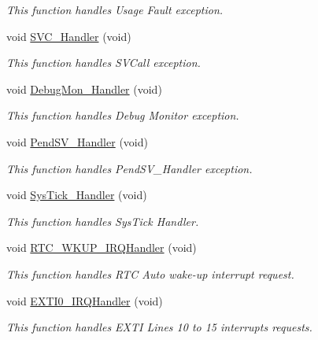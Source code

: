 \begin{DoxyCompactItemize}
\begin{DoxyCompactList}\small\item\em This function handles Usage Fault exception. \end{DoxyCompactList}\item 
void \hyperlink{group___p_w_r___current_consumption_ga3e5ddb3df0d62f2dc357e64a3f04a6ce}{S\-V\-C\-\_\-\-Handler} (void)
\begin{DoxyCompactList}\small\item\em This function handles S\-V\-Call exception. \end{DoxyCompactList}\item 
void \hyperlink{group___p_w_r___current_consumption_gadbdfb05858cc36fc520974df37ec3cb0}{Debug\-Mon\-\_\-\-Handler} (void)
\begin{DoxyCompactList}\small\item\em This function handles Debug Monitor exception. \end{DoxyCompactList}\item 
void \hyperlink{group___p_w_r___current_consumption_ga6303e1f258cbdc1f970ce579cc015623}{Pend\-S\-V\-\_\-\-Handler} (void)
\begin{DoxyCompactList}\small\item\em This function handles Pend\-S\-V\-\_\-\-Handler exception. \end{DoxyCompactList}\item 
void \hyperlink{group___p_w_r___current_consumption_gab5e09814056d617c521549e542639b7e}{Sys\-Tick\-\_\-\-Handler} (void)
\begin{DoxyCompactList}\small\item\em This function handles Sys\-Tick Handler. \end{DoxyCompactList}\item 
void \hyperlink{group___p_w_r___current_consumption_ga53a3fe340e323e2fec8d851cd2e83554}{R\-T\-C\-\_\-\-W\-K\-U\-P\-\_\-\-I\-R\-Q\-Handler} (void)
\begin{DoxyCompactList}\small\item\em This function handles R\-T\-C Auto wake-\/up interrupt request. \end{DoxyCompactList}\item 
void \hyperlink{group___p_w_r___current_consumption_ga17e9789a29a87d2df54f12b94dd1a0b6}{E\-X\-T\-I0\-\_\-\-I\-R\-Q\-Handler} (void)
\begin{DoxyCompactList}\small\item\em This function handles E\-X\-T\-I Lines 10 to 15 interrupts requests. \end{DoxyCompactList}\item 

\end{DoxyCompactItemize}
